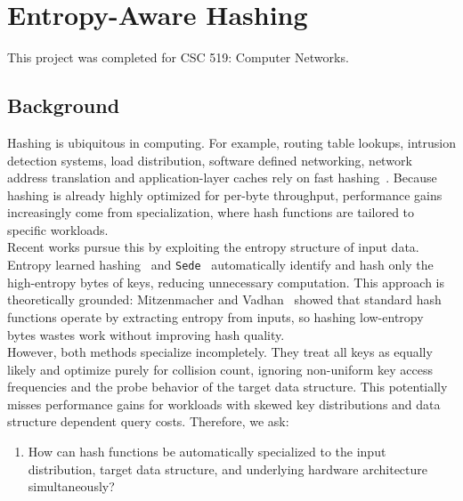 \section{Entropy-Aware Hashing}

This project was completed for CSC 519: Computer Networks.

\subsection{Background}

Hashing is ubiquitous in computing. For example, routing table lookups, intrusion detection systems, load distribution, software defined networking, network 
address translation and application-layer caches rely on fast hashing~\cite{kurose2025}. Because hashing is already highly optimized for per-byte throughput, 
performance gains increasingly come from specialization, where hash functions are tailored to specific workloads. \\


\noindent
Recent works pursue this by exploiting the entropy structure of input data. Entropy learned hashing~\cite{hentschel2022} and \texttt{Sede}~\cite{hoffmann2025} 
automatically identify and hash only the high-entropy bytes of keys, reducing unnecessary computation. This approach is theoretically grounded: Mitzenmacher and 
Vadhan~\cite{mitzenmacher2008} showed that standard hash functions operate by extracting entropy from inputs, so hashing low-entropy bytes wastes work without 
improving hash quality. \\

\noindent
However, both methods specialize incompletely. They treat all keys as equally likely and optimize purely for collision count, ignoring non-uniform key access 
frequencies and the probe behavior of the target data structure. This potentially misses performance gains for workloads with skewed key distributions and
data structure dependent query costs. Therefore, we ask:
\begin{enumerate}
    \item How can hash functions be automatically specialized to the input distribution, target data structure, and underlying hardware architecture 
    simultaneously?
\end{enumerate}

